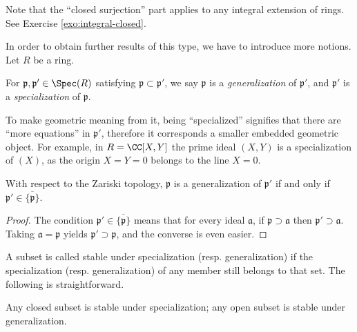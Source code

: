 Note that the ``closed surjection'' part applies to any integral extension of rings. See Exercise \ref{exo:integral-closed}.

In order to obtain further results of this type, we have to introduce more notions. Let $R$ be a ring.
\begin{definition}
	For $\mathfrak{p}, \mathfrak{p}' \in \Spec(R)$ satisfying $\mathfrak{p} \subset \mathfrak{p}'$, we say $\mathfrak{p}$ is a \emph{generalization} of $\mathfrak{p}'$, and $\mathfrak{p}'$ is a \emph{specialization} of $\mathfrak{p}$.
\end{definition}
To make geometric meaning from it, being ``specialized'' signifies that there are ``more equations'' in $\mathfrak{p}'$, therefore it corresponds a smaller embedded geometric object. For example, in $R=\CC[X,Y]$ the prime ideal $(X,Y)$ is a specialization of $(X)$, as the origin $X=Y=0$ belongs to the line $X=0$.

\begin{lemma}
	With respect to the Zariski topology, $\mathfrak{p}$ is a generalization of $\mathfrak{p}'$ if and only if $\mathfrak{p}' \in \overline{\{\mathfrak{p}\}}$.
\end{lemma}
\begin{proof}
	The condition $\mathfrak{p}' \in \overline{\{\mathfrak{p}\}}$ means that for every ideal $\mathfrak{a}$, if $\mathfrak{p} \supset \mathfrak{a}$ then $\mathfrak{p}' \supset \mathfrak{a}$. Taking $\mathfrak{a} = \mathfrak{p}$ yields $\mathfrak{p}' \supset \mathfrak{p}$, and the converse is even easier.
\end{proof}
A subset is called stable under specialization (resp. generalization) if the specialization (resp. generalization) of any member still belongs to that set. The following is straightforward.

\begin{lemma}\label{prop:stability-vs-closeness-0}
	Any closed subset is stable under specialization; any open subset is stable under generalization.
\end{lemma}

